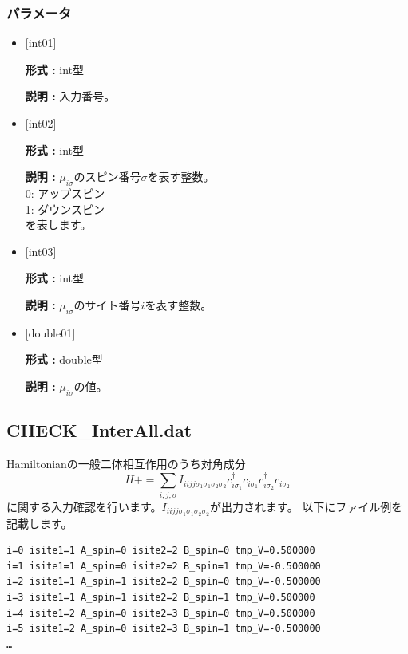 \subsubsection{パラメータ}
 \begin{itemize}

   \item  $[$int01$]$ 
   
    {\bf 形式 :} int型

   {\bf 説明 :} 入力番号。
   
   \item  $[$int02$]$ 
   
    {\bf 形式 :} int型

   {\bf 説明 :} $\mu_{i\sigma}$のスピン番号$\sigma$を表す整数。\\
0: アップスピン\\
1: ダウンスピン\\
を表します。
   
   \item  $[$int03$]$ 
   
    {\bf 形式 :} int型

    {\bf 説明 :}  $\mu_{i\sigma}$のサイト番号$i$を表す整数。
 
   \item  $[$double01$]$ 
   
    {\bf 形式 :} double型

   {\bf 説明 :} $\mu_{i\sigma}$の値。
     
\end{itemize}

\subsection{CHECK\_InterAll.dat}
Hamiltonianの一般二体相互作用のうち対角成分
\begin{equation}
H+=\sum_{i,j, \sigma} I_{iijj\sigma_1\sigma_1\sigma_2\sigma_2} c_{i\sigma_1}^{\dagger}c_{i\sigma_1}c_{i\sigma_2}^{\dagger}c_{i\sigma_2}
\end{equation}
に関する入力確認を行います。$ I_{iijj\sigma_1\sigma_1\sigma_2\sigma_2}$が出力されます。
以下にファイル例を記載します。

\begin{minipage}{12.5cm}
\begin{screen}
\begin{verbatim}
i=0 isite1=1 A_spin=0 isite2=2 B_spin=0 tmp_V=0.500000 
i=1 isite1=1 A_spin=0 isite2=2 B_spin=1 tmp_V=-0.500000 
i=2 isite1=1 A_spin=1 isite2=2 B_spin=0 tmp_V=-0.500000 
i=3 isite1=1 A_spin=1 isite2=2 B_spin=1 tmp_V=0.500000 
i=4 isite1=2 A_spin=0 isite2=3 B_spin=0 tmp_V=0.500000 
i=5 isite1=2 A_spin=0 isite2=3 B_spin=1 tmp_V=-0.500000 
…
\end{verbatim}
\end{screen}
\end{minipage}

